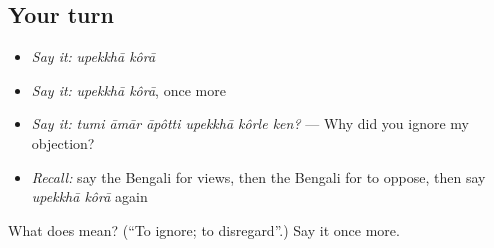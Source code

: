 \subsection*{Your turn}
\begin{itemize}
\raggedright
  \item \emph{Say it:} \emph{upekkhā kôrā}
  \item \emph{Say it:} \emph{upekkhā kôrā}, once more
  \item \emph{Say it:} \emph{tumi āmār āpôtti upekkhā kôrle ken?} — Why did you ignore my objection?
  \item \emph{Recall:} say the Bengali for views, then the Bengali for to oppose, then say \emph{upekkhā kôrā} again
\end{itemize}

\begin{tcolorbox}[breakable,colback=teal!4,colframe=teal!35!black,title={Before you move on}]
What does   mean? (\textquotedblleft{}To ignore; to disregard\textquotedblright{}.) Say it once more.
\end{tcolorbox}
